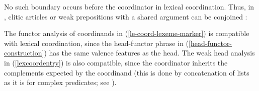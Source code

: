 \eal
\label{fr1}
\zl




No such boundary occurs before the coordinator in lexical coordination. Thus, in ,  clitic
articles or weak prepositions with a shared argument can be conjoined \citep[]{Abeille:06}:


\eal
{}
\zl

\noindent
The functor analysis of coordinands in (\ref{le-coord-lexeme-marker}) is compatible with lexical
coordination, since the head-functor phrase in (\ref{head-functor-construction}) has the same
valence features as the head. The weak head analysis in (\ref{lexcoordentry}) is also compatible,
since the coordinator inherits the complements expected by the coordinand (this is done by
concatenation of \comps lists as it is for complex predicates; see
).


                                                    
